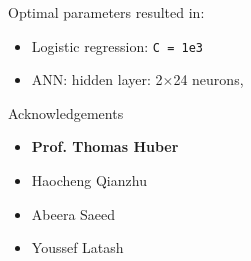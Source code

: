\documentclass{beamer}
\begin{document}
\begin{frame}
    Optimal parameters resulted in:
    \begin{itemize}
        \item Logistic regression: \texttt{C = 1e3}
        \item ANN: hidden layer: 2$\times$24 neurons,
    \end{itemize}
\end{frame}

\begin{frame}{Acknowledgements}
\begin{itemize}
    \item \textbf{Prof. Thomas Huber}
    \item Haocheng Qianzhu
    \item Abeera Saeed
    \item Youssef Latash
\end{itemize}


\end{frame}
\end{document}
